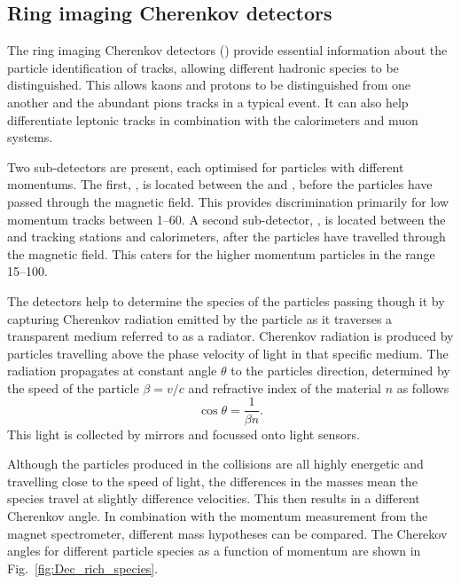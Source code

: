 

\subsection{Ring imaging Cherenkov detectors}
\label{sec:Dec_RICH}
The ring imaging Cherenkov detectors (\rich) provide essential information about the particle identification of tracks, allowing different hadronic species to be distinguished.
This allows kaons and protons to be distinguished from one another and the abundant pions tracks in a typical event. It can also help differentiate leptonic tracks in combination with the calorimeters and muon systems. 

Two \rich sub-detectors are present, each optimised for particles with different momentums. The first, \richone, is located between the \velo and \ttracker, before the particles have passed through the magnetic field. This provides discrimination primarily for low momentum tracks between 1--60\gevc. A second sub-detector, \richtwo, is located between the \intr and \ot tracking stations and calorimeters, after the particles have travelled through the magnetic field. This caters for the higher momentum particles in the range 15--100\gevc. 

The \rich detectors help to determine the species of the particles passing though it by capturing Cherenkov radiation emitted by the particle as it traverses a transparent medium referred to as a radiator. Cherenkov radiation is produced by particles travelling above the phase velocity of light in that specific medium. The radiation propagates at constant angle $\theta$ to the particles direction, determined by the speed of the particle $\beta = v/c$ and refractive index of the material $n$ as follows
\begin{equation}
\cos{\theta} = \frac{1}{\beta n}.
\end{equation}
This light is collected by mirrors and focussed onto light sensors. 

Although the particles produced in the collisions are all highly energetic and travelling close to the speed of light, the differences in the masses mean the species travel at slightly difference velocities. This then results in a different Cherenkov angle. In combination with the momentum measurement from the magnet spectrometer, different mass hypotheses can be compared. The Cherekov angles for different particle species as a function of momentum are shown in Fig.~\ref{fig:Dec_rich_species}. 


